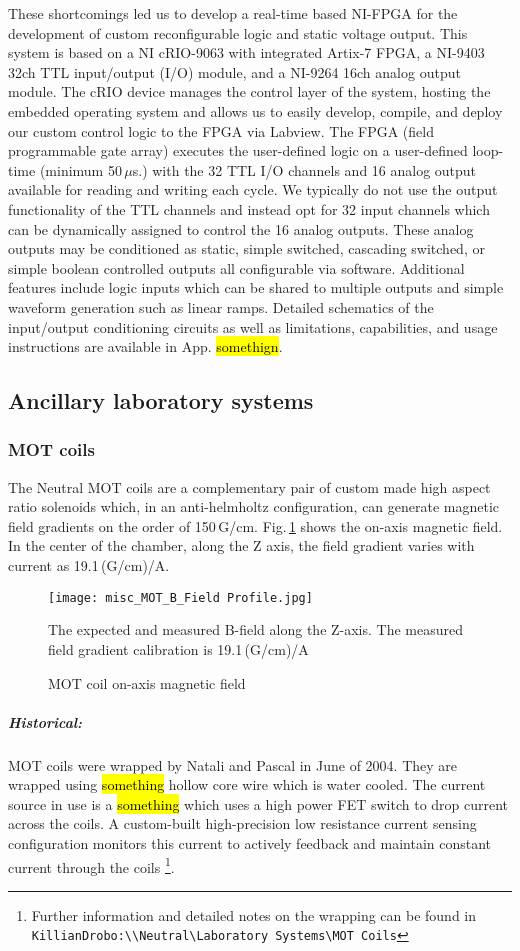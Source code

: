 These shortcomings led us to develop a real-time based NI-FPGA for the development of custom reconfigurable logic and static voltage output.
This system is based on a NI cRIO-9063 with integrated Artix-7 FPGA, a NI-9403 32ch TTL input/output (I/O) module, and a NI-9264 16ch analog output module.
The cRIO device manages the control layer of the system, hosting the embedded operating system and allows us to easily develop, compile, and deploy our custom control logic to the FPGA via Labview.
The FPGA (field programmable gate array) executes the user-defined logic on a user-defined loop-time (minimum 50\,$\mu$s.) with the 32 TTL I/O channels and 16 analog output available for reading and writing each cycle.
We typically do not use the output functionality of the TTL channels and instead opt for 32 input channels which can be dynamically assigned to control the 16 analog outputs.
These analog outputs may be conditioned as static, simple switched, cascading switched, or simple boolean controlled outputs all configurable via software.
Additional features include logic inputs which can be shared to multiple outputs and simple waveform generation such as linear ramps.
Detailed schematics of the input/output conditioning circuits as well as limitations, capabilities, and usage instructions are available in App. \hl{somethign}.

\subsection{Ancillary laboratory systems} \label{ssec:misc_sys}
\subsubsection{MOT coils}
The Neutral MOT coils are a complementary pair of custom made high aspect ratio solenoids which, in an anti-helmholtz configuration, can generate magnetic field gradients on the order of 150\,G/cm.
Fig.\,\ref{fig:motCoilField} shows the on-axis magnetic field.
In the center of the chamber, along the Z axis, the field gradient varies with current as 19.1\,(G/cm)/A.
	\begin{figure}
		\centerline{
		\texttt{[image: misc\_MOT\_B\_Field Profile.jpg]}}
		\caption{MOT coil on-axis magnetic field}{The expected and measured B-field along the Z-axis. The measured field gradient calibration is 19.1\,(G/cm)/A}
		\label{fig:motCoilField}
	\end{figure}

\subparagraph{Historical:}
\setcounter{footnote}{0}
MOT coils were wrapped by Natali and Pascal in June of 2004.
They are wrapped using \hl{something} hollow core wire which is water cooled.
The current source in use is a \hl{something} which uses a high power FET switch to drop current across the coils.
A custom-built high-precision low resistance current sensing configuration monitors this current to actively feedback and maintain constant current through the coils \footnote{Further information and detailed notes on the wrapping can be found in \texttt{KillianDrobo:\textbackslash\textbackslash Neutral\textbackslash Laboratory Systems\textbackslash MOT Coils}}.

